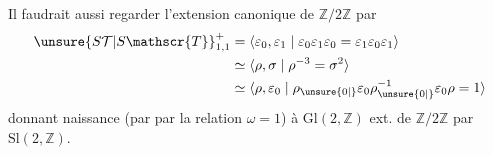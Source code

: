 Il faudrait aussi regarder l'extension canonique
de $\mathbb{Z}/2\mathbb{Z}$ par
\[\begin{aligned}
\unsure{S\mathcal{T}|S\mathscr{T}}_{1,1}^+&=\langle \varepsilon_0,\varepsilon_1\mid \varepsilon_0\varepsilon_1\varepsilon_0=\varepsilon_1\varepsilon_0\varepsilon_1\rangle\\
&\simeq\langle\rho,\sigma\mid \rho^{-3}=\sigma^2\rangle\\
&\simeq\langle\rho,\varepsilon_0\mid \rho_{\unsure{0|\vphantom{0}}}\varepsilon_0\rho_{\unsure{0|\vphantom{0}}}^{-1}\varepsilon_0\rho=1\rangle
\end{aligned}\]
donnant naissance (par  par la relation $\omega=1$)
à $\mathrm{Gl}(2,\mathbb{Z})$ ext. de $\mathbb{Z}/2\mathbb{Z}$ par $\mathrm{Sl}(2,\mathbb{Z})$.
